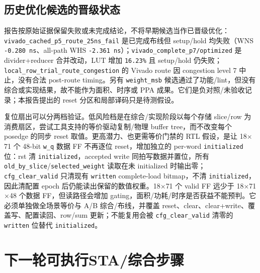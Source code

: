 \documentclass[UTF8,fontset=fandol,10pt,a4paper,openany]{ctexrep}
\newcommand{\code}[1]{\nolinkurl{#1}}
\begin{document}
\subsection{历史优化候选的晋级状态}


报告按原始证据保留失败或未完成结论，不将早期候选当作已晋级优化：\code{vivado_cached_p5_route_25ns_fail} 是已完成布线但 setup/hold 均失败（WNS \code{-0.280 ns}、all-path WHS \code{-2.361 ns}）；\code{vivado_complete_p7/optimized} 是 divider+reducer 合并改动，LUT 增加 \code{16.23\%} 且 setup/hold 仍失败；\code{local_row_trial_route_congestion} 的 Vivado route 因 congestion level 7 中止，没有合法 post-route timing。另有 \code{weight_msb} 候选通过了功能/lint，但没有综合或实现结果，故不能作为面积、时序或 PPA 成果。它们是负对照/未验收记录；本报告提出的 reset 分区和局部译码只是待测假设。


复位扇出可以分两档验证。低风险档是在综合/实现阶段以每个存储 slice/row 为消费扇区，尝试工具支持的等价驱动复制/物理 buffer tree，而不改变每个 posedge 的同步 reset 取值。更高潜力、也更需等价门禁的 RTL 假设，是让 18\ensuremath{\times}71 个 48-bit \code{w_q} 数据 FF 不再逐位 reset，增加独立的 per-word \code{initialized} 位：rst 清 \code{initialized}，accepted write 同拍写数据并置位，所有 \code{old_by_slice}/\code{selected_weight} 读取在未 initialized 时输出零；\code{cfg_clear_valid} 只清现有 \code{written} complete-load bitmap，不清 \code{initialized}，因此清配置 epoch 后仍能读出保留的数值权重。18\ensuremath{\times}71 个 valid FF 远少于 18\ensuremath{\times}71\ensuremath{\times}48 个数据 FF，但读路径会增加 gating，面积/功耗/时序是否获益不能预判。它必须单独做全场景等价与 A/B 综合/布线，并覆盖 reset、clear、clear+write、覆盖写、配置读回、row/sum 更新；不能复用会被 \code{cfg_clear_valid} 清零的 \code{written} 位替代 \code{initialized}。


\section{下一轮可执行STA/综合步骤}
\end{document}
